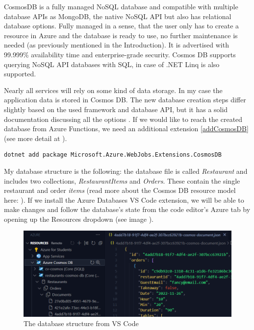CosmosDB \cite{CosmosDBIntro} is a fully managed NoSQL database and compatible with multiple database APIs as MongoDB, the native NoSQL API but also has relational database options. Fully managed in a sense, that the user only has to create a resource in Azure and the database is ready to use, no further maintenance is needed (as previously mentioned in the Introduction). It is advertised with 99.999\% availability time and enterprise-grade security. Cosmos DB supports querying NoSQL API databases with SQL, in case of .NET Linq is also supported. 

Nearly all services will rely on some kind of data storage. In my case the application data is stored in Cosmos DB. The new database creation steps differ slightly based on the used framework and database API, but it has a solid documentation discussing all the options \cite{CosmosDBQuickstart}. If we would like to reach the created database from Azure Functions, we need an additional extension \ref{addCosmosDB} (see more detail at \cite{CosmosDBBinding}).

\lstset{ breaklines=true }
\begin{lstlisting}[frame=single,float=!ht, caption=Adding Cosmos DB to a Function App, label=addCosmosDB]
	dotnet add package Microsoft.Azure.WebJobs.Extensions.CosmosDB
\end{lstlisting}

My database structure is the following: the database file is called \emph{Restaurant} and includes two collections, \emph{RestaurantItems} and \emph{Orders}. These contain the single restaurant and order \emph{items} (read more about the Cosmos DB resource model here: \cite{CosmosDBResourceModel}). If we install the Azure Databases VS Code extension, we will be able to make changes and follow the database's state from the code editor's Azure tab by opening up the Resources dropdown (see image ). 
\begin{figure}[!ht]
	\centering
	\includegraphics[width=150mm, keepaspectratio]{figures/DB/CosmosStructure.png}
	\caption{The database structure from VS Code} 
	\label{fig:CosmosStructure}
\end{figure}


